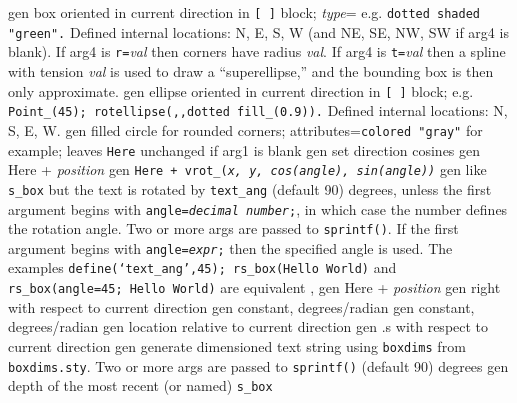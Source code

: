   {gen}
  {box oriented in current direction in {\tt [ ]} block;
   {\sl type}= e.g. {\tt dotted shaded "green".}  Defined internal
   locations: N, E, S, W (and NE, SE, NW, SW if arg4 is blank).  If arg4
   is {\tt r=}{\sl val} then corners have radius {\sl val}.  If arg4 is
   {\tt t=}{\sl val} then a spline with tension {\sl val} is used to draw
   a ``superellipse,'' and the bounding box is then only approximate. }
  {gen}
  {ellipse oriented in current direction in {\tt [ ]} block;
   e.g. {\tt Point\_(45); rotellipse(,{},dotted fill\_(0.9)).} Defined
   internal locations: N, S, E, W.}
  {gen}
  {filled circle for rounded corners; attributes={\tt colored
  "gray"}
   for example; leaves {\tt Here} unchanged if arg1 is blank
    }
  {gen}
  {set direction cosines}
  {gen}
  {Here + {\sl position}}
  {gen}
  {\tt Here + vrot\_({\sl x, y, cos(angle), sin(angle))}}
  {gen}
  {like {\tt s\_box} but the text is rotated by {\tt text\_ang}
   (default 90) degrees, unless
   the first argument begins with {\tt angle={\sl decimal number};},
   in which case the number defines the rotation angle.
   Two or more args are passed to {\tt sprintf()}.
   If the first argument begins with {\tt angle={\sl expr};} then
   the specified angle is used.
   The examples {\tt define(`text\_ang',45); rs\_box(Hello World)} and
   {\tt rs\_box(angle=45; Hello World)} are equivalent
   , }
  {gen}
  {Here + {\sl position}}
  {gen}
  {right with respect to current direction}
  {gen}
  {constant, degrees/radian}
  {gen}
  {constant, degrees/radian}
  {gen}
  {location relative to current direction}
%
  {gen}
  {.s with respect to current direction}
  {gen}
  {generate dimensioned text string using {\tt{}boxdims} from
    {\tt boxdims.sty}. Two or more args are passed to {\tt sprintf()}
   (default 90) degrees }
  {gen}
  {depth of the most recent (or named) {\tt s\_box}
    }
